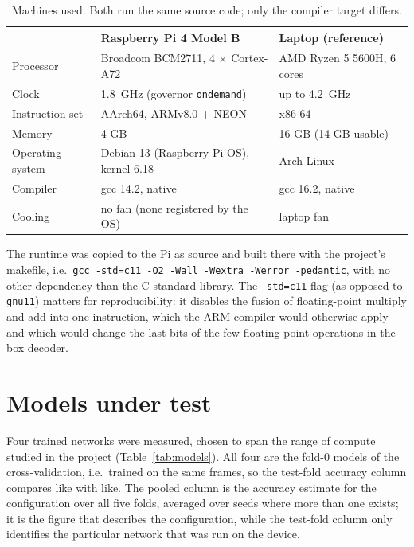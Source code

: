 \documentclass[11pt,a4paper]{article}
\begin{document}
\begin{table}[h]
\centering
\caption{Machines used. Both run the same source code; only the compiler target differs.}
\label{tab:hw}
\begin{tabular}{lll}
\toprule
 & Raspberry Pi 4 Model B & Laptop (reference) \\
\midrule
Processor & Broadcom BCM2711, 4 $\times$ Cortex-A72 & AMD Ryzen 5 5600H, 6 cores \\
Clock & \SI{1.8}{GHz} (governor \texttt{ondemand}) & up to \SI{4.2}{GHz} \\
Instruction set & AArch64, ARMv8.0 + NEON & x86-64 \\
Memory & 4 GB & 16 GB (14 GB usable) \\
Operating system & Debian 13 (Raspberry Pi OS), kernel 6.18 & Arch Linux \\
Compiler & gcc 14.2, native & gcc 16.2, native \\
Cooling & no fan (none registered by the OS) & laptop fan \\
\bottomrule
\end{tabular}
\end{table}

The runtime was copied to the Pi as source and built there with the
project's makefile, i.e.\ \texttt{gcc -std=c11 -O2 -Wall -Wextra -Werror
-pedantic}, with no other dependency than the C standard library. The
\texttt{-std=c11} flag (as opposed to \texttt{gnu11}) matters for
reproducibility: it disables the fusion of floating-point multiply and add
into one instruction, which the ARM compiler would otherwise apply and which
would change the last bits of the few floating-point operations in the box
decoder.

\section{Models under test}
\label{sec:models}

Four trained networks were measured, chosen to span the range of compute
studied in the project (Table~\ref{tab:models}). All four are the fold-0
models of the cross-validation, i.e.\ trained on the same frames, so the
test-fold accuracy column compares like with like. The pooled column is the
accuracy estimate for the configuration over all five folds, averaged over
seeds where more than one exists; it is the figure that describes the
configuration, while the test-fold column only identifies the particular
network that was run on the device.
\end{document}
